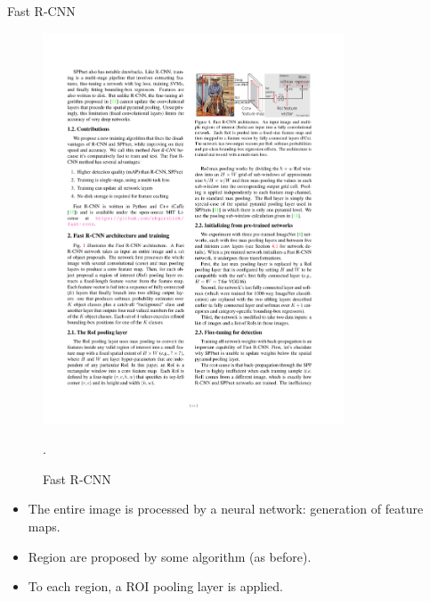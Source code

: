 \documentclass[xcolor=pdftex,dvipsnames,table]{beamer}
\begin{document}
\begin{frame}{Fast R-CNN}
\begin{figure}[htb]
   \centering
   \includegraphics[width=0.8\textwidth]{../graphics/Fast_R-CNN.pdf}
   \caption{Fast R-CNN \cite{Girshick2015}}.
\end{figure}
\begin{itemize}
	\item The entire image is processed by a neural network: generation of feature maps.
	\item Region are proposed by some algorithm (as before).
	\item To each region, a ROI pooling layer is applied. 
\end{itemize}
\end{frame}
\end{document}
